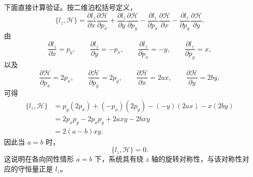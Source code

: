 \begin{solution}[正则泊松括号关系]
\[\]
下面直接计算验证。按二维泊松括号定义，
\[
\{l_z,\mathcal H\}
=
\frac{\partial l_z}{\partial x}\frac{\partial\mathcal H}{\partial p_x}
+
\frac{\partial l_z}{\partial y}\frac{\partial\mathcal H}{\partial p_y}
-
\frac{\partial l_z}{\partial p_x}\frac{\partial\mathcal H}{\partial x}
-
\frac{\partial l_z}{\partial p_y}\frac{\partial\mathcal H}{\partial y}.
\]
由
\[
\frac{\partial l_z}{\partial x}=p_y,\qquad
\frac{\partial l_z}{\partial y}=-p_x,\qquad
\frac{\partial l_z}{\partial p_x}=-y,\qquad
\frac{\partial l_z}{\partial p_y}=x,
\]
以及
\[
\frac{\partial\mathcal H}{\partial p_x}=2p_x,\qquad
\frac{\partial\mathcal H}{\partial p_y}=2p_y,\qquad
\frac{\partial\mathcal H}{\partial x}=2ax,\qquad
\frac{\partial\mathcal H}{\partial y}=2by,
\]
可得
\[
\begin{aligned}
\{l_z,\mathcal H\}
&=
p_y(2p_x)+(-p_x)(2p_y)-(-y)(2ax)-x(2by)\\
&=
2p_xp_y-2p_xp_y+2axy-2bxy\\
&=
2(a-b)xy.
\end{aligned}
\]
因此当 \(a=b\) 时，
\[
\{l_z,\mathcal H\}=0.
\]
这说明在各向同性情形 \(a=b\) 下，系统具有绕 \(z\) 轴的旋转对称性，与该对称性对应的守恒量正是 \(l_z\)。
\end{solution}


